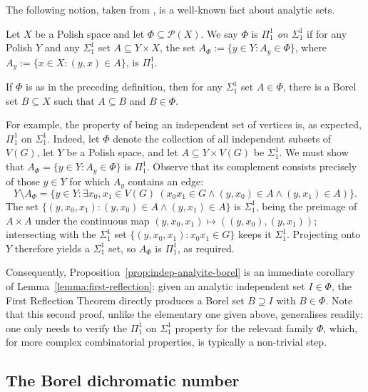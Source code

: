 The following notion, taken from \cite[Theorem~35.10, p.~285]{Kechris_1995_DescriptiveSetTheory}, is a well-known fact about analytic sets.

\begin{definition}\label{def:pi11-on-sigma11}
    Let $X$ be a Polish space and let $\Phi\subseteq\mathcal P(X)$.
    We say $\Phi$ is \emph{$\Pi^1_1$ on $\Sigma^1_1$} if for any Polish $Y$ and any $\Sigma^1_1$ set $A\subseteq Y\times X$, the set $A_\Phi:=\{y\in Y:A_y\in\Phi\}$, where $A_y:=\{x\in X:(y,x)\in A\}$, is $\Pi^1_1$.
\end{definition}

\begin{lemma}\label{lemma:first-reflection}
    If $\Phi$ is as in the preceding definition, then for any $\Sigma^1_1$ set $A\in\Phi$, there is a Borel set $B\subseteq X$ such that $A\subseteq B$ and $B\in\Phi$.
\end{lemma}

For example, the property of being an independent set of vertices is, as expected, $\Pi^1_1$ on $\Sigma^1_1$.
Indeed, let $\Phi$ denote the collection of all independent subsets of $V(G)$, let $Y$ be a Polish space, and let $A\subseteq Y\times V(G)$ be $\Sigma^1_1$.
We must show that $A_\Phi=\{y\in Y: A_y\in\Phi\}$ is $\Pi^1_1$.
Observe that its complement consists precisely of those $y\in Y$ for which $A_y$ contains an edge:
$$Y\setminus A_\Phi = \{y\in Y:\exists x_0,x_1\in V(G)\ (x_0x_1\in G\wedge (y,x_0)\in A\wedge (y,x_1)\in A)\}.$$
The set $\{(y,x_0,x_1): (y,x_0)\in A\wedge (y,x_1)\in A\}$ is $\Sigma^1_1$, being the preimage of $A\times A$ under the continuous map $(y,x_0,x_1)\mapsto ((y,x_0),(y,x_1))$; intersecting with the $\Sigma^1_1$ set $\{(y,x_0,x_1): x_0x_1\in G\}$ keeps it $\Sigma^1_1$.
Projecting onto $Y$ therefore yields a $\Sigma^1_1$ set, so $A_\Phi$ is $\Pi^1_1$, as required.

Consequently, Proposition~\ref{prop:indep-analyitc-borel} is an immediate corollary of Lemma~\ref{lemma:first-reflection}: given an analytic independent set $I\in\Phi$, the First Reflection Theorem directly produces a Borel set $B\supseteq I$ with $B\in\Phi$.
Note that this second proof, unlike the elementary one given above, generalises readily: one only needs to verify the $\Pi^1_1$ on $\Sigma^1_1$ property for the relevant family $\Phi$, which, for more complex combinatorial properties, is typically a non-trivial step.

\subsection{The Borel dichromatic number}

